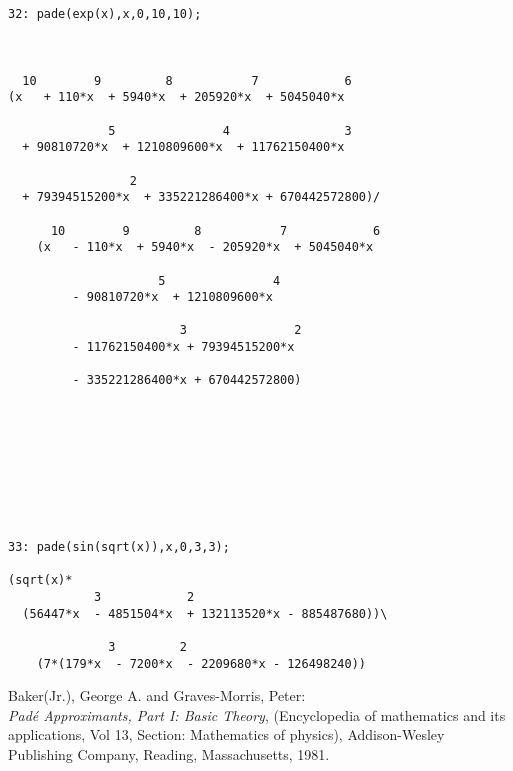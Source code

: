 \begin{verbatim}
32: pade(exp(x),x,0,10,10); 



  10        9         8           7            6
(x   + 110*x  + 5940*x  + 205920*x  + 5045040*x

              5               4                3
  + 90810720*x  + 1210809600*x  + 11762150400*x

                 2
  + 79394515200*x  + 335221286400*x + 670442572800)/

      10        9         8           7            6
    (x   - 110*x  + 5940*x  - 205920*x  + 5045040*x

                     5               4
         - 90810720*x  + 1210809600*x 

                        3               2
         - 11762150400*x + 79394515200*x  

         - 335221286400*x + 670442572800)









33: pade(sin(sqrt(x)),x,0,3,3);
        
(sqrt(x)*
            3            2
  (56447*x  - 4851504*x  + 132113520*x - 885487680))\

              3         2
    (7*(179*x  - 7200*x  - 2209680*x - 126498240))
\end{verbatim}


\begin{thebibliography}{9}
 Baker(Jr.), George A. and Graves-Morris, Peter:\\
{\it Pad\'{e} Approximants, Part I: Basic Theory},
(Encyclopedia of mathematics and its applications, Vol 13,
Section: Mathematics of physics),
Addison-Wesley Publishing Company, Reading, Massachusetts, 1981.
\end{thebibliography}


